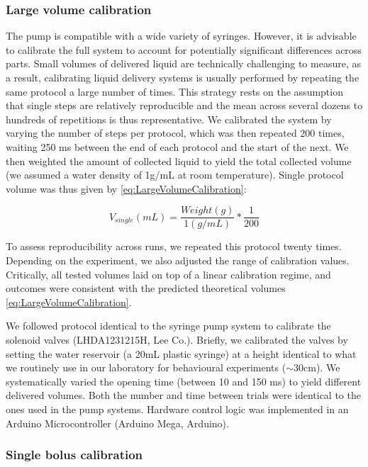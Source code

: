 \subsubsection*{Large volume calibration}
The pump is compatible with a wide variety of syringes. However, it is advisable to calibrate the full system to account for potentially significant differences across parts. Small volumes of delivered liquid are technically challenging to measure, as a result, calibrating liquid delivery systems is usually performed by repeating the same protocol a large number of times. This strategy rests on the assumption that single steps are relatively reproducible and the mean across several dozens to hundreds of repetitions is thus representative. We calibrated the system by varying the number of steps per protocol, which was then repeated 200 times, waiting 250 ms between the end of each protocol and the start of the next. We then weighted the amount of collected liquid to yield the total collected volume (we assumed a water density of 1g/mL at room temperature). Single protocol volume was thus given by \ref{eq:LargeVolumeCalibration}:

\begin{equation} \label{eq:LargeVolumeCalibration}
    V_{single}(mL) = \frac{Weight (g)}{1 (g/mL)} * \frac{1}{200}
    \end{equation}

To assess reproducibility across runs, we repeated this protocol twenty times. Depending on the experiment, we also adjusted the range of calibration values. Critically, all tested volumes laid on top of a linear calibration regime, and outcomes were consistent with the predicted theoretical volumes \cref{eq:LargeVolumeCalibration}.

We followed protocol identical to the syringe pump system to calibrate the solenoid valves (LHDA1231215H, Lee Co.). Briefly, we calibrated the valves by setting the water reservoir (a 20mL plastic syringe) at a height identical to what we routinely use in our laboratory for behavioural experiments ($\sim$30cm). We systematically varied the opening time (between 10 and 150 ms) to yield different delivered volumes. Both the number and time between trials were identical to the ones used in the pump systems. Hardware control logic was implemented in an Arduino Microcontroller (Arduino Mega, Arduino).

\subsubsection*{Single bolus calibration}

